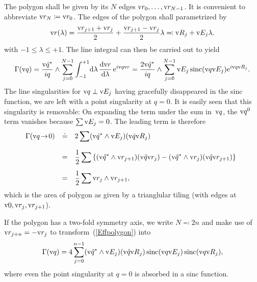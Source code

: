 The polygon shall be given by its $N$ edges $\text{v}{r}_0,\ldots,\text{v}{r}_{N-1}$.
It is convenient to abbreviate $\text{v}{r}_N\coloneqq\text{v}{r}_0$.
The edges of the polygon shall parametrized by
\begin{equation}
  \text{v}{r}(\lambda) = \frac{\text{v}{r}_{j+1}+\text{v}{r}_j}{2} + \frac{\text{v}{r}_{j+1}-\text{v}{r}_j}{2} \lambda
  \eqqcolon \text{v}{R}_j + \text{v}{E}_j\lambda.
\end{equation}
with $-1\le\lambda\le+1$.
The line integral can then be carried out to yield
\begin{equation}\label{Effpolygon}
    \Gamma(\text{v}{q}) = \displaystyle \frac{\text{v}{\hat q^*}}{iq}\wedge \sum_{j=0}^{N-1}
              \int_{-1}^{+1}\!\text{d}\lambda\, \frac{\text{d}\text{v}{r}}{\text{d}\lambda}\,\text{e}^{i\text{v}{q}\text{v}{r}}
          = \displaystyle \frac{2\text{v}{\hat q^*}}{iq}\wedge \sum_{j=0}^{N-1}
              \text{v}{E}_j \operatorname{sinc}(\text{v}{q}\text{v}{E}_j) \text{e}^{i\text{v}{q}\text{v}{R}_j}.
\end{equation}
The line singularities for $\text{v}{q}\perp\text{v}{E}_j$ having gracefully disappeared in the
sinc function,
we are left with a point singularity at $q=0$.
It is easily seen that this singularity is removable:
On expanding the term under the sum in~$\text{v}{q}$,
the $\text{v}{q}^0$ term vanishes because $\sum\text{v}{E}_j=0$.
The leading term is therefore
\begin{equation}
  \begin{array}{@{}lcl}
  \Gamma(\q\!\to\!0) &\doteq& \displaystyle 2\sum (\v{\hat q^*}\wedge\E_j) (\v{\hat q}\R_j)\\[3ex]
    &=&\displaystyle \frac{1}{2}\sum \left\{
        (\v{\hat q^*}\wedge\r_{j+1})(\v{\hat q}\r_j) -
        (\v{\hat q^*}\wedge\r_j)(\v{\hat q}\r_{j+1})
      \right\}\\[3ex]
    &=&\displaystyle \frac{1}{2}\sum \r_j\wedge\r_{j+1},
  \end{array}
\end{equation}
which is the area of polygon
as given by a trianglular tiling (with edges at $\text{v}{0},\text{v}{r}_j,\text{v}{r}_{j+1}$).

If the polygon has a two-fold symmetry axis, we write $N\eqqcolon2n$
and make use of $\text{v}{r}_{j+n}=-\text{v}{r}_j$ to transform~(\ref{Effpolygon}) into
\begin{equation}\label{Eff2ngon}
    \Gamma(\text{v}{q}) = \displaystyle 4 \sum_{j=0}^{n-1}
              (\text{v}{\hat q^*}\wedge\text{v}{E}_j) (\text{v}{\hat q}\text{v}{R}_j) \operatorname{sinc}(\text{v}{q}\text{v}{E}_j) \operatorname{sinc}(\text{v}{q}\text{v}{R}_j),
\end{equation}
where even the point singularity at $q=0$ is absorbed in a sinc function.

\iffalse
\section{Special functions near the removable singularity}

\index{Machine epsilon}
We assume a double-precision machine epsilon
of $\epsilon=2^{-52}\simeq2.2\cdot10^{-16}$.

\fi

